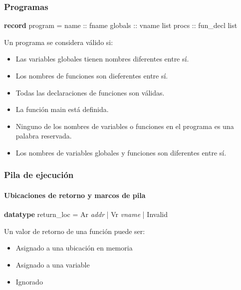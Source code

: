 \begin{frame}[fragile]
\frametitle{Programas}

\begin{semiverbatim}
\textbf{record} program =
  name :: fname
  globals :: vname list
  procs :: fun_decl list
\end{semiverbatim}
\pause

\begin{block}{Un programa se considera válido si:}
\begin{itemize}
\item{Las variables globales tienen nombres diferentes entre sí.}
\pause
\item{Los nombres de funciones son dieferentes entre sí.}
\pause
\item{Todas las declaraciones de funciones son válidas.}
\pause
\item{La función main está definida.}
\pause
\item{Ninguno de los nombres de variables o funciones en el programa es una palabra reservada.}
\pause
\item{Los nombres de variables globales y funciones son diferentes entre sí.}
\end{itemize}
\end{block}


\end{frame}


\begin{frame}[fragile]
\frametitle{Pila de ejecución}
\framesubtitle{Ubicaciones de retorno y marcos de pila}

\begin{semiverbatim}
\textbf{datatype} return_loc = \alert<3>{Ar \textit{addr}} | \alert<4>{Vr \textit{vname}} | \alert<5>{Invalid}
\end{semiverbatim}

\pause

Un valor de retorno de una función puede ser:
\begin{itemize}
\item<3->{\alert<3>{Asignado a una ubicación en memoria}}
\item<4->{\alert<4>{Asignado a una variable}}
\item<5->{\alert<5>{Ignorado}}
\end{itemize}


\bigskip
{}

\bigskip



\end{frame}


